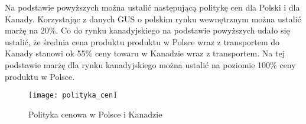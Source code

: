 \documentclass[
12pt, %
a4paper
]{report}
\begin{document}
		Na podstawie powyższych można ustalić  następującą politykę cen dla Polski i dla Kanady. Korzystając z danych GUS o polskim rynku wewnętrznym można ustalić marżę na 20\%. Co do rynku kanadyjskiego na podstawie powyższych udało się ustalić, że średnia cena produktu produktu w Polsce wraz z transportem do Kanady stanowi ok 55\% ceny towaru w Kanadzie wraz z transportem. Na tej podstawie marżę dla rynku kanadyjskiego można ustalić na poziomie 100\% ceny produktu w Polsce. 
		
		
		
		\begin{figure}[H]
			\centering
			\texttt{[image: polityka\_cen]}
			\caption{Polityka cenowa w Polsce i Kanadzie}
			\label{polityka_cen}
		\end{figure}

        
		
		
\end{document}

